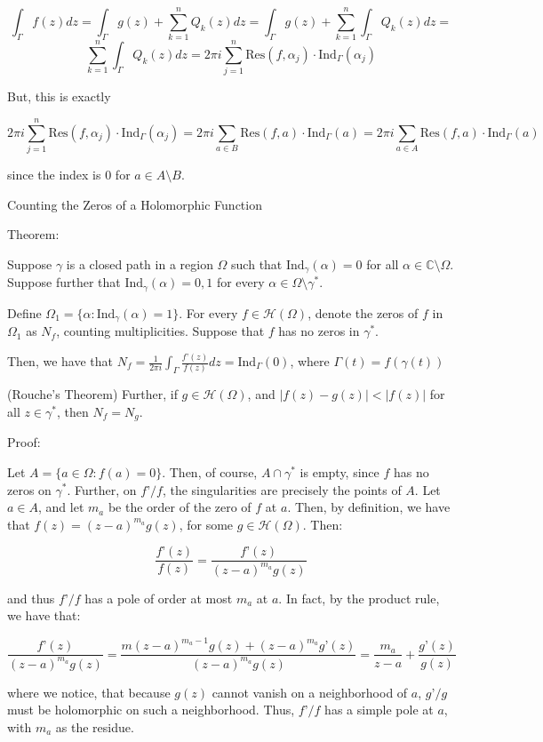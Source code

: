 \documentclass[10pt]{article}
\newcommand{\calH}{\mathcal{H}}
\newcommand{\ind}{\text{Ind}}
\newcommand{\res}{\text{Res}}
\begin{document}
$$ \int_\Gamma f(z) dz = \int_\Gamma g(z) + \sum_{k=1}^n Q_k(z) dz = \int_\Gamma g(z) + \sum_{k=1}^n \int_\Gamma Q_k(z) dz =$$
$$ \sum_{k=1}^n \int_\Gamma Q_k(z) dz =2 \pi i  \sum_{j=1}^n \res(f,\alpha_j) \cdot \ind_\Gamma(\alpha_j)$$

But, this is exactly 

$$2 \pi i  \sum_{j=1}^n \res(f,\alpha_j) \cdot \ind_\Gamma(\alpha_j) = 2 \pi i  \sum_{a \in B} \res(f,a) \cdot \ind_\Gamma(a) =   2 \pi i  \sum_{a \in A} \res(f,a) \cdot \ind_\Gamma(a)$$

since the index is 0 for $a \in A \setminus B$.

Counting the Zeros of a Holomorphic Function

Theorem:

Suppose $\gamma$ is a closed path in a region $\Omega$ such that $\ind_\gamma(\alpha) = 0$ for all $\alpha \in \mathbb{C} \setminus \Omega$. Suppose further that $\ind_\gamma(\alpha) = 0, 1$ for every $\alpha \in \Omega \setminus \gamma^*$.

Define $\Omega_1 = \{ \alpha : \ind_\gamma(\alpha) = 1 \}$. For every $f \in \calH(\Omega)$, denote the zeros of $f$ in $\Omega_1$ as $N_f$, counting multiplicities. Suppose that $f$ has no zeros in $\gamma^*$.

Then, we have that $N_f = \frac{1}{2\pi i} \int_\Gamma \frac{f’(z)}{f(z)} dz = \ind_\Gamma(0)$, where $\Gamma(t) = f(\gamma(t))$

(Rouche’s Theorem) Further, if $g \in \calH(\Omega)$, and $| f(z) - g(z) | < |f(z)|$ for all $z \in \gamma^*$, then $N_f = N_g$.

Proof:

Let $A = \{ a \in \Omega : f(a) = 0 \}$. Then, of course, $A \cap \gamma^*$ is empty, since $f$ has no zeros on $\gamma^*$. Further, on $f’/f$, the singularities are precisely the points of $A$. Let $a \in A$, and let $m_a$ be the order of the zero of $f$ at $a$. Then, by definition, we have that $f(z) = (z-a)^{m_a} g(z)$, for some $g \in \calH(\Omega)$. Then:

$$\frac{f’(z)}{f(z)} = \frac{f’(z)}{(z-a)^{m_a} g(z)} $$

and thus $f’/f$ has a pole of order at most $m_a$ at $a$. In fact, by the product rule, we have that:

$$ \frac{f’(z)}{(z-a)^{m_a} g(z)} = \frac{m(z-a)^{m_a-1}g(z) + (z-a)^{m_a} g’(z)}{(z-a)^{m_a} g(z)}   = \frac{m_a}{z-a} + \frac{g’(z)}{g(z)} $$

where we notice, that because $g(z)$ cannot vanish on a neighborhood of $a$, $g’/g$ must be holomorphic on such a neighborhood. Thus, $f’/f$ has a simple pole at $a$, with $m_a$ as the residue. 
\end{document}
